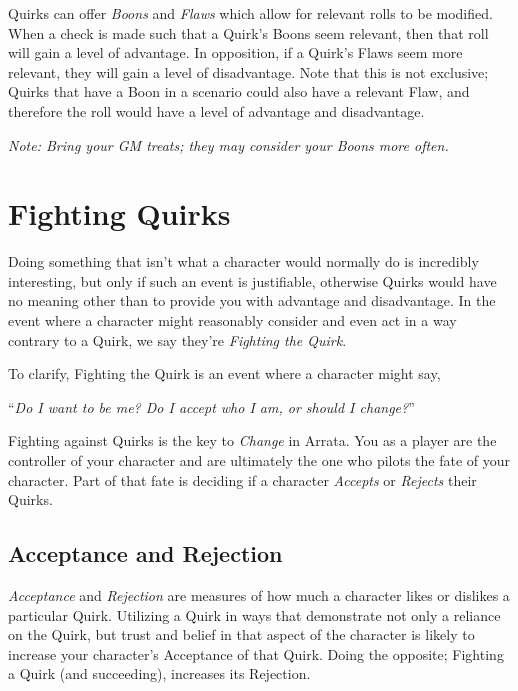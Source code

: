 \documentclass[../main.tex]{subfiles}
\begin{document}
    Quirks can offer \emph{Boons} and \emph{Flaws} which allow for relevant rolls to be modified. When a check is made such that a Quirk's Boons seem relevant, then that roll will gain a level of advantage. In opposition, if a Quirk's Flaws seem more relevant, they will gain a level of disadvantage. Note that this is not exclusive; Quirks that have a Boon in a scenario could also have a relevant Flaw, and therefore the roll would have a level of advantage and disadvantage.

    \emph{Note: Bring your GM treats; they may consider your Boons more often.}
    \begin{mdframed}[style=Arrata]
        {\em
            \lipsum[1]
        }
    \end{mdframed}

    \section{Fighting Quirks}

    Doing something that isn't what a character would normally do is incredibly interesting, but only if such an event is justifiable, otherwise Quirks would have no meaning other than to provide you with advantage and disadvantage. In the event where a character might reasonably consider and even act in a way contrary to a Quirk, we say they're \emph{Fighting the Quirk}.

    To clarify, Fighting the Quirk is an event where a character might say,
    
    \begin{center}
        ``\emph{Do I want to be me? Do I accept who I am, or should I change?}''
    \end{center}
    
    Fighting against Quirks is the key to \emph{Change} in Arrata. You as a player are the controller of your character and are ultimately the one who pilots the fate of your character. Part of that fate is deciding if a character \emph{Accepts} or \emph{Rejects} their Quirks.

    \subsection{Acceptance and Rejection}

    \emph{Acceptance} and \emph{Rejection} are measures of how much a character likes or dislikes a particular Quirk. Utilizing a Quirk in ways that demonstrate not only a reliance on the Quirk, but trust and belief in that aspect of the character is likely to increase your character's Acceptance of that Quirk. Doing the opposite; Fighting a Quirk (and succeeding), increases its Rejection.
    
\end{document}
